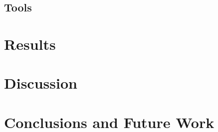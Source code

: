 \documentclass[10pt,conference]{IEEEtran}
\begin{document}
\subsection{Tools}

\section{Results}\label{results}

\section{Discussion}\label{discussion}

\section{Conclusions and Future Work}\label{conclusions}



\end{document}
